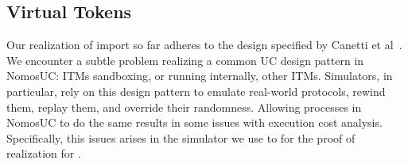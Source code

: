 %
%
%
%
%

\subsection{Virtual Tokens}
Our realization of import so far adheres to the design specified by Canetti et al~\cite{canettiUC}.
We encounter a subtle problem realizing a common UC design pattern in NomosUC: ITMs sandboxing, or running internally, other ITMs.
Simulators, in particular, rely on this design pattern to emulate real-world protocols, rewind them, replay them, and override their randomness.
Allowing processes in NomosUC to do the same results in some issues with execution cost analysis.
Specifically, this issues arises in the simulator we use to for the proof of realization for \protcom.

